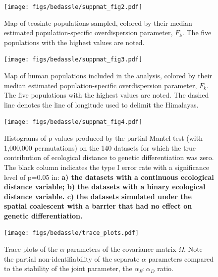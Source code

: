 \begin{figure}[ht!]
\begin{center}
  \texttt{[image: figs/bedassle/suppmat\_fig2.pdf]}
 \caption{
\textmd{Map of teosinte populations sampled, colored by their median estimated population-specific overdispersion parameter, $F_{k}$.  The five populations with the highest values are noted.}
 \label{sfig:zea_Fk_map}
  }
\end{center}
\end{figure}

\begin{figure}[ht!]
\begin{center}
  \texttt{[image: figs/bedassle/suppmat\_fig3.pdf]}
 \caption{
\textmd{Map of human populations included in the analysis, colored by their median estimated population-specific overdispersion parameter, $F_{k}$.  The five populations with the highest values are noted.  
The dashed line denotes the line of longitude used to delimit the Himalayas.}
 \label{sfig:him_Fk_map}
  }
\end{center}
\end{figure}

\begin{figure}[ht!]
\begin{center}
  \texttt{[image: figs/bedassle/suppmat\_fig4.pdf]}
 \caption{
 		\textmd{Histograms of p-values produced by the partial Mantel test (with 1,000,000 permutations) on the 140 datasets for which the true contribution of ecological distance to genetic differentiation was zero. The black column indicates the type I error rate with a significance level of p=0.05 in:}
	\bf{a)}
 		\textmd{the datasets with a continuous ecological distance variable;}
	\bf{b)}
 		\textmd{the datasets with a binary ecological distance variable.}
	\bf{c)}
 		\textmd{the datasets simulated under the spatial coalescent with a barrier that had no effect on genetic differentiation.}		
 \label{sfig:Pmantel}
  }
\end{center}
\end{figure}

\begin{figure}[ht!]
\begin{center}
  \texttt{[image: figs/bedassle/trace\_plots.pdf]}
 \caption{
 		\textmd{Trace plots of the $\alpha$ parameters of the covariance matrix $\Omega$.  Note the partial non-identifiability of the separate $\alpha$ parameters compared to the stability of the joint parameter, the $\alpha_E:\alpha_D$ ratio.}
 \label{sfig:trace_plots}
 }
\end{center}
\end{figure}

